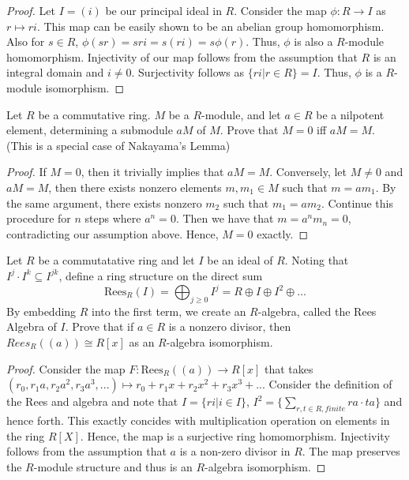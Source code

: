 \documentclass[Aluffi.tex]{subfiles}
\begin{document}
\begin{proof}
Let $I = (i)$ be our principal ideal in $R$. Consider the map $\phi: R \rightarrow I$ as $r \mapsto ri$. This map can be easily shown to be an abelian group homomorphism. Also for $s \in R$, $\phi(sr) = sri = s(ri) = s \phi(r)$. Thus, $\phi$ is also a $R$-module homomorphism. Injectivity of our map follows from the assumption that $R$ is an integral domain and $i \neq 0$. Surjectivity follows as $\{ri \vert r \in R\} = I$. Thus, $\phi$ is a $R$-module isomorphism. 
\end{proof}

\begin{problem}
Let $R$ be a commutative ring. $M$ be a $R$-module, and let $a \in R$ be a nilpotent element, determining a submodule $aM$ of $M$. Prove that $M = 0$ iff $aM = M$. (This is a special case of Nakayama's Lemma)
\end{problem}

\begin{proof}
If $M = 0$, then it trivially implies that $aM =M$. Conversely, let $M \neq 0$ and $aM = M$, then there exists  nonzero elements $m,m_1 \in M$ such that $m = am_1$. By the same argument, there exists nonzero $m_2$
such that $m_1 = am_2$. Continue this procedure for $n$ steps where $a^n = 0$. Then we have that $m = a^nm_n = 0$, contradicting our assumption above. Hence, $M = 0$ exactly.
\end{proof}

\begin{problem}
Let $R$ be a commutatative ring and let $I$ be an ideal of $R$. Noting that $I^j \cdot I^k \subseteq I^{jk}$,
define a ring structure on the direct sum 
$$\text{Rees}_R(I) = \bigoplus_{j \geq 0} I^j = R \oplus I \oplus I^2 \oplus ...$$
By embedding $R$ into the first term, we create an $R$-algebra, called the Rees Algebra of $I$. Prove that if $a \in R$ is a nonzero divisor, then $Rees_{R}((a)) \cong R[x]$ as an $R$-algebra isomorphism. 
\end{problem}

\begin{proof}
Consider the map $F: \text{Rees}_R((a)) \rightarrow R[x]$ that takes $(r_0,r_1a,r_2a^2,r_3a^3,...) \mapsto r_0 + r_1x + r_2x^2 + r_3x^3 + ...$ Consider the definition of the Rees and algebra and note that 
$ I = \{ri \vert i \in I\}$, $I^2 = \{\sum_{r,t \in R,finite} ra \cdot ta \}$ and hence forth. This exactly concides with multiplication operation on elements in the ring $R[X]$. Hence, the map is a surjective ring homomorphism. Injectivity follows from the assumption that $a$ is a non-zero divisor in $R$. The map preserves the $R$-module structure and thus is an $R$-algebra isomorphism.  
\end{proof}
\end{document}
